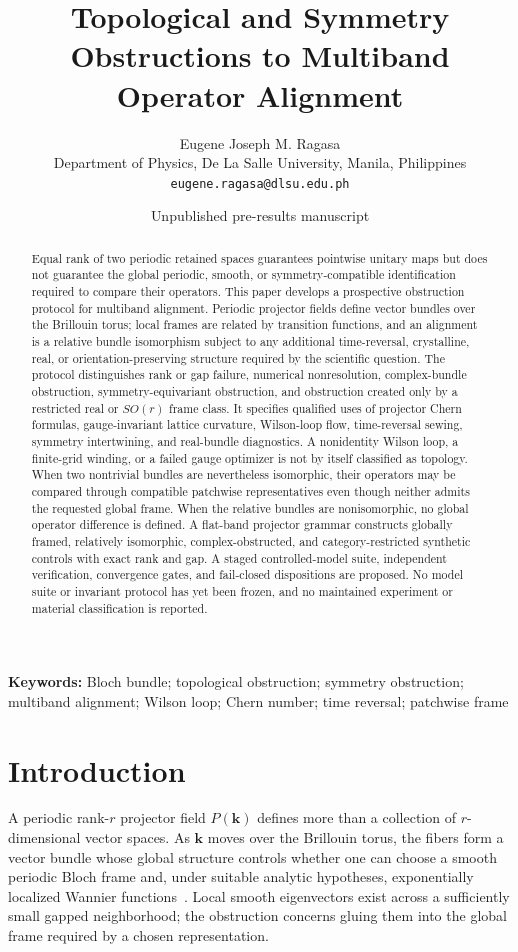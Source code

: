 \documentclass[11pt]{article}
\title{Topological and Symmetry Obstructions to Multiband\\Operator Alignment}
\author{Eugene Joseph M. Ragasa\\
Department of Physics, De La Salle University, Manila, Philippines\\
\texttt{eugene.ragasa@dlsu.edu.ph}}
\date{Unpublished pre-results manuscript}
\begin{document}
\maketitle

\begin{abstract}
Equal rank of two periodic retained spaces guarantees pointwise unitary maps but does not
guarantee the global periodic, smooth, or symmetry-compatible identification required to
compare their operators. This paper develops a prospective obstruction protocol for
multiband alignment. Periodic projector fields define vector bundles over the Brillouin
torus; local frames are related by transition functions, and an alignment is a relative
bundle isomorphism subject to any additional time-reversal, crystalline, real, or
orientation-preserving structure required by the scientific question. The protocol
distinguishes rank or gap failure, numerical nonresolution, complex-bundle obstruction,
symmetry-equivariant obstruction, and obstruction created only by a restricted real or
$SO(r)$ frame class. It specifies qualified uses of projector Chern formulas,
gauge-invariant lattice curvature, Wilson-loop flow, time-reversal sewing, symmetry
intertwining, and real-bundle diagnostics. A nonidentity Wilson loop, a finite-grid
winding, or a failed gauge optimizer is not by itself classified as topology. When two
nontrivial bundles are nevertheless isomorphic, their operators may be compared through
compatible patchwise representatives even though neither admits the requested global
frame. When the relative bundles are nonisomorphic, no global operator difference is
defined. A flat-band projector grammar constructs globally framed, relatively
isomorphic, complex-obstructed, and category-restricted synthetic controls with exact
rank and gap. A staged controlled-model suite, independent verification, convergence
gates, and fail-closed dispositions are proposed. No model suite or invariant protocol
has yet
been frozen, and no maintained experiment or material classification is reported.
\end{abstract}

\noindent\textbf{Keywords:} Bloch bundle; topological obstruction; symmetry obstruction;
multiband alignment; Wilson loop; Chern number; time reversal; patchwise frame

\section{Introduction}
A periodic rank-$r$ projector field $P(\mathbf k)$ defines more than a collection of
$r$-dimensional vector spaces. As $\mathbf k$ moves over the Brillouin torus, the fibers
form a vector bundle whose global structure controls whether one can choose a smooth
periodic Bloch frame and, under suitable analytic hypotheses, exponentially localized
Wannier functions~\cite{brouder2007,panati2007}. Local smooth eigenvectors exist across a
sufficiently small gapped neighborhood; the obstruction concerns gluing them into the
global frame required by a chosen representation.
\end{document}
